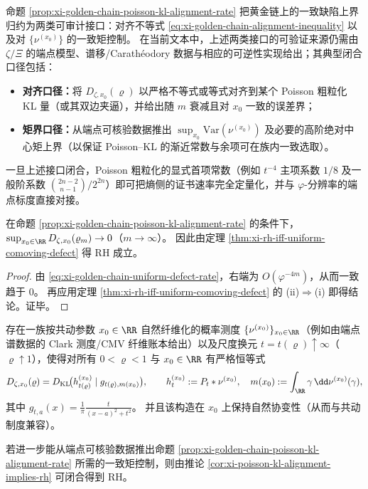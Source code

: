 \begin{remark}\label{rem:xi-golden-chain-alignment-interface-boundary}
命题 \ref{prop:xi-golden-chain-poisson-kl-alignment-rate} 把黄金链上的一致缺陷上界归约为两类可审计接口：对齐不等式 \eqref{eq:xi-golden-chain-alignment-inequality} 以及对 \(\{\nu^{(x_0)}\}\) 的一致矩控制。
在当前文本中，上述两类接口的可验证来源仍需由 \(\zeta/\Xi\) 的端点模型、谱移/Carath\'eodory 数据与相应的可逆性实现给出；其典型闭合口径包括：
\begin{itemize}
  \item \textbf{对齐口径：}将 \(D_{\zeta,x_0}(\varrho)\) 以严格不等式或等式对齐到某个 Poisson 粗粒化 KL 量（或其双边夹逼），并给出随 \(m\) 衰减且对 \(x_0\) 一致的误差界；
  \item \textbf{矩界口径：}从端点可核验数据推出 \(\sup_{x_0}\mathrm{Var}(\nu^{(x_0)})\) 及必要的高阶绝对中心矩上界（以保证 Poisson--KL 的渐近常数与余项可在族内一致选取）。
\end{itemize}
一旦上述接口闭合，Poisson 粗粒化的显式首项常数（例如 \(t^{-4}\) 主项系数 \(1/8\) 及一般阶系数 \(\binom{2n-2}{n-1}/2^{2n}\)）即可把熵侧的证书速率完全定量化，并与 \(\varphi\)-分辨率的端点标度直接对接。
\end{remark}

\begin{corollary}[对齐接口闭合推出 RH]\label{cor:xi-poisson-kl-alignment-implies-rh}
在命题 \ref{prop:xi-golden-chain-poisson-kl-alignment-rate} 的条件下，
\(
\sup_{x_0\in\RR}D_{\zeta,x_0}(\varrho_m)\to 0
\)（\(m\to\infty\)）。
因此由定理 \ref{thm:xi-rh-iff-uniform-comoving-defect} 得 RH 成立。
\end{corollary}

\begin{proof}
由 \eqref{eq:xi-golden-chain-uniform-defect-rate}，右端为 \(O(\varphi^{-4m})\)，从而一致趋于 \(0\)。
再应用定理 \ref{thm:xi-rh-iff-uniform-comoving-defect} 的 (ii)\(\Rightarrow\)(i) 即得结论。证毕。
\end{proof}

\begin{conjecture}\label{conj:xi-poisson-kl-exact-alignment}
存在一族按共动参数 \(x_0\in\RR\) 自然纤维化的概率测度 \(\{\nu^{(x_0)}\}_{x_0\in\RR}\)（例如由端点谱数据的 Clark 测度/CMV 纤维账本给出）以及尺度换元 \(t=t(\varrho)\uparrow\infty\)（\(\varrho\uparrow 1\)），使得对所有 \(0<\varrho<1\) 与 \(x_0\in\RR\) 有严格恒等式
\[
D_{\zeta,x_0}(\varrho)
=D_{\mathrm{KL}}\!\bigl(h^{(x_0)}_{t(\varrho)}\mid g_{t(\varrho),m(x_0)}\bigr),
\qquad
h^{(x_0)}_{t}:=P_t*\nu^{(x_0)},\quad
m(x_0):=\int_{\RR}\gamma\,\dd\nu^{(x_0)}(\gamma),
\]
其中 \(g_{t,a}(x)=\frac{1}{\pi}\frac{t}{(x-a)^2+t^2}\)。
并且该构造在 \(x_0\) 上保持自然协变性（从而与共动制度兼容）。
\par
若进一步能从端点可核验数据推出命题 \ref{prop:xi-golden-chain-poisson-kl-alignment-rate} 所需的一致矩控制，则由推论 \ref{cor:xi-poisson-kl-alignment-implies-rh} 可闭合得到 RH。
\end{conjecture}

